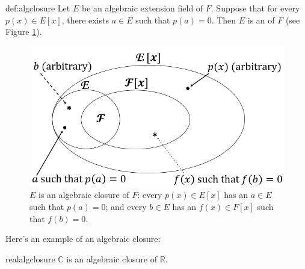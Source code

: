
\begin{defn}{def:algclosure}  
Let $E$ be an algebraic extension field of $F$. Suppose that for every $p(x) \in E[x]$, there exists $a \in E$ such that $p(a)=0$.  Then  $E$ is  an  of $F$ (see Figure \ref{algebraicclosure}).
\end{defn}

\begin{figure}
\begin{center}
\includegraphics[scale=0.35]{images/algebraic_closure.png}
\caption{$E$ is an algebraic closure of $F$:  every $p(x)\in E[x]$ has an $a\in E$ such that $p(a)=0$; and every $b\in E$ has an $f(x)\in F[x]$ such that $f(b)=0$.}\label{algebraicclosure}
\end{center}
\end{figure}

Here's an example of an algebraic closure:

\begin{prop}{realalgclosure}
$\mathbb{C}$ is an algebraic closure of $\mathbb{R}$.
\end{prop}


